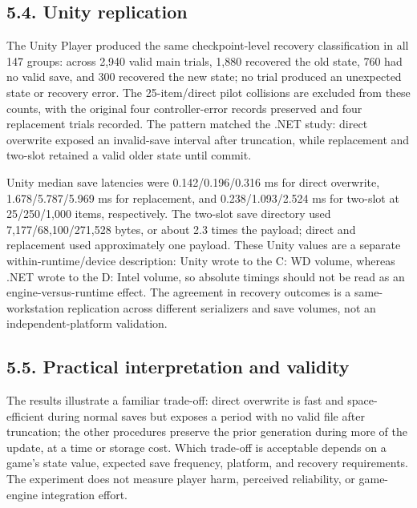 \documentclass{jepcs}
\begin{document}
\subsection{5.4. Unity replication}
The Unity Player produced the same checkpoint-level recovery classification in all 147 groups: across 2,940 valid main trials, 1,880 recovered the old state, 760 had no valid save, and 300 recovered the new state; no trial produced an unexpected state or recovery error. The 25-item/direct pilot collisions are excluded from these counts, with the original four controller-error records preserved and four replacement trials recorded. The pattern matched the .NET study: direct overwrite exposed an invalid-save interval after truncation, while replacement and two-slot retained a valid older state until commit.

Unity median save latencies were 0.142/0.196/0.316 ms for direct overwrite, 1.678/5.787/5.969 ms for replacement, and 0.238/1.093/2.524 ms for two-slot at 25/250/1,000 items, respectively. The two-slot save directory used 7,177/68,100/271,528 bytes, or about 2.3 times the payload; direct and replacement used approximately one payload. These Unity values are a separate within-runtime/device description: Unity wrote to the C: WD volume, whereas .NET wrote to the D: Intel volume, so absolute timings should not be read as an engine-versus-runtime effect. The agreement in recovery outcomes is a same-workstation replication across different serializers and save volumes, not an independent-platform validation.

\subsection{5.5. Practical interpretation and validity}
The results illustrate a familiar trade-off: direct overwrite is fast and space-efficient during normal saves but exposes a period with no valid file after truncation; the other procedures preserve the prior generation during more of the update, at a time or storage cost. Which trade-off is acceptable depends on a game's state value, expected save frequency, platform, and recovery requirements. The experiment does not measure player harm, perceived reliability, or game-engine integration effort.
\end{document}
